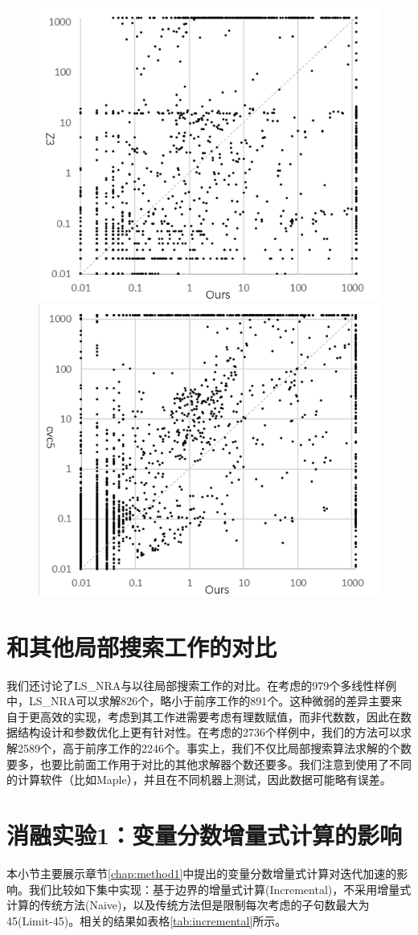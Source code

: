 \begin{figure}[t]
    \centering
    \includegraphics[width=0.45\columnwidth]{Img/scatter_z3b.png}\qquad
    \includegraphics[width=0.45\columnwidth]{Img/scatter_cvc5b.png}
\label{fig:scatter}
\end{figure}

\section{和其他局部搜索工作的对比}
我们还讨论了LS\_NRA与以往局部搜索工作的对比。在\cite{multilinear}考虑的979个多线性样例中，LS\_NRA可以求解826个，略小于前序工作的891个。这种微弱的差异主要来自于\cite{multilinear}更高效的实现，考虑到其工作进需要考虑有理数赋值，而非代数数，因此在数据结构设计和参数优化上更有针对性。在\cite{LiXZ23}考虑的2736个样例中，我们的方法可以求解2589个，高于前序工作的2246个。事实上，我们不仅比局部搜索算法求解的个数要多，也要比前面工作用于对比的其他求解器个数还要多。我们注意到\cite{LiXZ23}使用了不同的计算软件（比如Maple），并且在不同机器上测试，因此数据可能略有误差。

\section{消融实验1：变量分数增量式计算的影响}
本小节主要展示章节\ref{chap:method1}中提出的变量分数增量式计算对迭代加速的影响。我们比较如下集中实现：基于边界的增量式计算(Incremental)，不采用增量式计算的传统方法(Naive)，以及传统方法但是限制每次考虑的子句数最大为45(Limit-45)。相关的结果如表格\ref{tab:incremental}所示。

